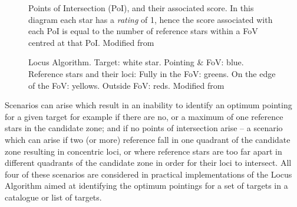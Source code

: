 \documentclass{aa}
\begin{document}
\begin{figure}[!htb]
\caption{\label{PoIscores}Points of Intersection (PoI), and their associated
score. In this diagram each star has a \textit{rating} of 1, hence the score
associated with each PoI is equal to the number of reference stars
within a FoV centred at that PoI. Modified from \citet{creaner2016thesis}}
\end{figure}

\begin{figure}[!htb]
\caption{\label{final}Locus Algorithm. Target: white star. Pointing \& FoV:
blue. Reference stars and their loci: Fully in the FoV: greens. On the
edge of the FoV: yellows. Outside FoV: reds.  Modified from \citet{creaner2016thesis}}
\end{figure}

Scenarios can arise which result in an inability to identify an optimum
pointing for a given target for example if there are no, or a maximum of
one reference stars in the candidate zone; and if no points of
intersection arise -- a scenario which can arise if two (or more)
reference fall in one quadrant of the candidate zone resulting in
concentric loci, or where reference stars are too far apart in different
quadrants of the candidate zone in order for their loci to intersect.
All four of these scenarios are considered in practical implementations
of the Locus Algorithm aimed at identifying the optimum pointings for a
set of targets in a catalogue or list of targets.
\end{document}
